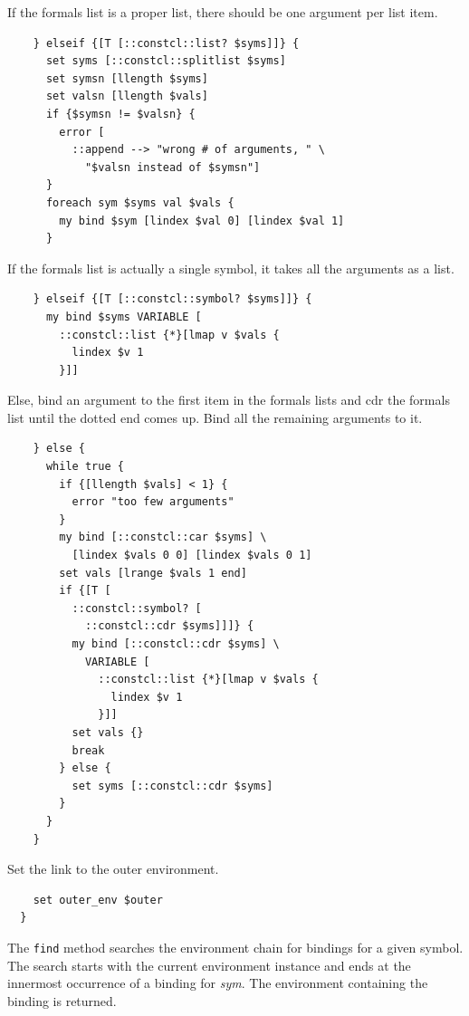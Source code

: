 \documentclass[twoside]{report}
\begin{document}
If the formals list is a proper list, there should be one argument per list item.

\begin{lstlisting}
    } elseif {[T [::constcl::list? $syms]]} {
      set syms [::constcl::splitlist $syms]
      set symsn [llength $syms]
      set valsn [llength $vals]
      if {$symsn != $valsn} {
        error [
          ::append --> "wrong # of arguments, " \
            "$valsn instead of $symsn"]
      }
      foreach sym $syms val $vals {
        my bind $sym [lindex $val 0] [lindex $val 1]
      }
\end{lstlisting}

If the formals list is actually a single symbol, it takes all the arguments as a list.

\begin{lstlisting}
    } elseif {[T [::constcl::symbol? $syms]]} {
      my bind $syms VARIABLE [
        ::constcl::list {*}[lmap v $vals {
          lindex $v 1
        }]]
\end{lstlisting}

Else, bind an argument to the first item in the formals lists and cdr the formals list until the dotted end comes up. Bind all the remaining arguments to it.

\begin{lstlisting}
    } else {
      while true {
        if {[llength $vals] < 1} {
          error "too few arguments"
        }
        my bind [::constcl::car $syms] \
          [lindex $vals 0 0] [lindex $vals 0 1]
        set vals [lrange $vals 1 end]
        if {[T [
          ::constcl::symbol? [
            ::constcl::cdr $syms]]]} {
          my bind [::constcl::cdr $syms] \
            VARIABLE [
              ::constcl::list {*}[lmap v $vals {
                lindex $v 1
              }]]
          set vals {}
          break
        } else {
          set syms [::constcl::cdr $syms]
        }
      }
    }
\end{lstlisting}

Set the link to the outer environment.

\begin{lstlisting}
    set outer_env $outer
  }
\end{lstlisting}

The \texttt{find} method searches the environment chain for bindings for a given symbol. The search starts with the current environment instance and ends at the innermost occurrence of a binding for \emph{sym}. The environment containing the binding is returned.
\end{document}
